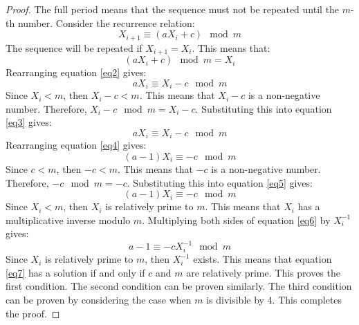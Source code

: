 \documentclass{article}
\begin{document}
\begin{proof}
    The full period means that the sequence must not be repeated until the $m$-th number. Consider the recurrence relation:
    \begin{equation}
        X_{i+1} \equiv (aX_i + c) \mod m \label{eq1}
    \end{equation}
    The sequence will be repeated if $X_{i+1} = X_i$. This means that:
    \begin{equation}
        (aX_i + c) \mod m = X_i \label{eq2}
    \end{equation}
    Rearranging equation \eqref{eq2} gives:
    \begin{equation}
        aX_i \equiv X_i - c \mod m \label{eq3}
    \end{equation}
    Since $X_i < m$, then $X_i - c < m$. This means that $X_i - c$ is a non-negative number. Therefore, $X_i - c \mod m = X_i - c$. Substituting this into equation \eqref{eq3} gives:
    \begin{equation}
        aX_i \equiv X_i - c \mod m \label{eq4}
    \end{equation}
    Rearranging equation \eqref{eq4} gives:
    \begin{equation}
        (a - 1)X_i \equiv -c \mod m \label{eq5}
    \end{equation}
    Since $c < m$, then $-c < m$. This means that $-c$ is a non-negative number. Therefore, $-c \mod m = -c$. Substituting this into equation \eqref{eq5} gives:
    \begin{equation}
        (a - 1)X_i \equiv -c \mod m \label{eq6}
    \end{equation}
    Since $X_i < m$, then $X_i$ is relatively prime to $m$. This means that $X_i$ has a multiplicative inverse modulo $m$. Multiplying both sides of equation \eqref{eq6} by $X_i^{-1}$ gives:
    \begin{equation}
        a - 1 \equiv -cX_i^{-1} \mod m \label{eq7}
    \end{equation}
    Since $X_i$ is relatively prime to $m$, then $X_i^{-1}$ exists. This means that equation \eqref{eq7} has a solution if and only if $c$ and $m$ are relatively prime. This proves the first condition. The second condition can be proven similarly. The third condition can be proven by considering the case when $m$ is divisible by 4. This completes the proof.
\end{proof}
\end{document}
